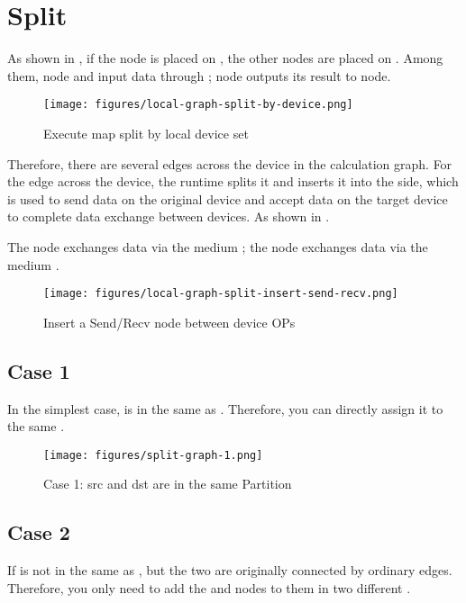 \section{Split}
\label{sec:graph-operation-split}
As shown in , if the  node is placed on , the other nodes are placed on . Among them, node  and  input data through ; node  outputs its result to  node.

\begin{figure}[H]
  \centering
  \texttt{[image: figures/local-graph-split-by-device.png]}
  \caption{Execute map split by local device set}
  \label{fig:local-graph-split-by-device}
\end{figure}

Therefore, there are several edges across the device in the calculation graph. For the edge across the device, the runtime splits it and inserts it into the  side, which is used to send data on the original device and accept data on the target device to complete data exchange between devices. As shown in .

The  node exchanges data via the medium ; the  node exchanges data via the medium .

\begin{figure}[H]
  \centering
  \texttt{[image: figures/local-graph-split-insert-send-recv.png]}
  \caption{Insert a Send/Recv node between device OPs}
  \label{fig:local-graph-split-insert-send-recv}
\end{figure}


\subsection{Case 1}
In the simplest case,  is in the same  as . Therefore, you can directly assign it to the same .

\begin{figure}[H]
  \centering
  \texttt{[image: figures/split-graph-1.png]}
  \caption{Case 1: src and dst are in the same Partition}
  \label{fig:split-graph-1}
\end{figure}


\subsection{Case 2}
If  is not in the same  as , but the two are originally connected by ordinary edges. Therefore, you only need to add the  and  nodes to them in two different .

